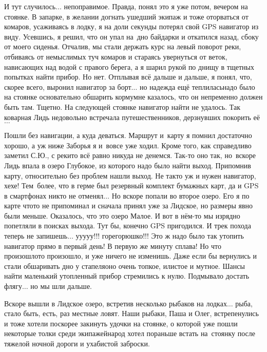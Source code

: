 И тут случилось$\ldots$ непоправимое. Правда, понял это я уже потом, вечером на стоянке. В запарке, в желании догнать ушедший экипаж и тоже оторваться от комаров, усаживаясь в лодку, я на доли секунды потерял свой GPS навигатор из виду. Усевшись, я решил, что он упал на~дно байдарки и откатился назад, сбоку от моего сиденья. Отчалив, мы стали держать курс на левый поворот реки, отбиваясь от немыслимых туч комаров и стараясь увернуться от веток, нависающих над водой с правого берега, а я шарил рукой по днищу в тщетных попытках найти прибор. Но нет. Отплывая всё дальше и дальше, я понял, что, скорее всего, выронил навигатор за борт$\ldots$ но надежда ещё теплилась\mdash надо было на стоянке основательно обшарить корму\mdash мне казалось, что он непременно должен быть там. Тщетно. На следующей стоянке навигатор найти не удалось. Так коварная Лидь недовольно встречала путешественников, дерзнувших покорить её$\ldots$

Пошли без навигации, а куда деваться. Маршрут и~карту я помнил достаточно хорошо, а уж ниже Заборья я и~вовсе уже ходил. Кроме того, как справедливо заметил С.Ю., с реки\sdash то всё равно никуда не денемся. Так-то оно так, но~вскоре Лидь впала в озеро Глубокое, из которого надо было найти выход. Припомнив карту, относительно без проблем нашли выход. Не так\sdash то уж и нужен навигатор, хе\sdash хе! Тем~более, что в герме был резервный комплект бумажных карт, да и GPS в смартфонах никто не отменял$\ldots$ Но вскоре попали во второе озеро. Его я по карте что\sdash то не припоминал и сначала принял уже за Лидское, но размеры явно были меньше. Оказалось, что это озеро Малое. И вот в нём-то мы изрядно попетляли в поисках выхода. Тут бы, конечно GPS пригодился. И трек похода теперь не запишешь$\ldots$ у\sdash у\sdash у\sdash у\sdash у!!! горе\sdash горюшко!!! Это ж надо было так утопить навигатор прямо в первый день! В первую же минуту сплава! Но что произошло\mdash то произошло, и уже ничего не изменишь. Даже если бы вернулись и стали обшаривать дно у стапеля\mdash оно очень топкое, илистое и мутное. Шансы найти маленький утопленный прибор стремились к нулю. Подмывало достать флягу$\ldots$ но мы шли дальше.

Вскоре вышли в Лидское озеро, встретив несколько рыбаков на лодках$\ldots$ рыба, стало быть, есть, раз местные ловят. Наши рыбаки, Паша и Олег, встрепенулись и тоже хотели поскорее закинуть удочки на стоянке, о которой уже пошли некоторые толки среди экипажей\mdash народ хотел пораньше встать на~стоянку после тяжелой ночной дороги и ухабистой заброски. 

